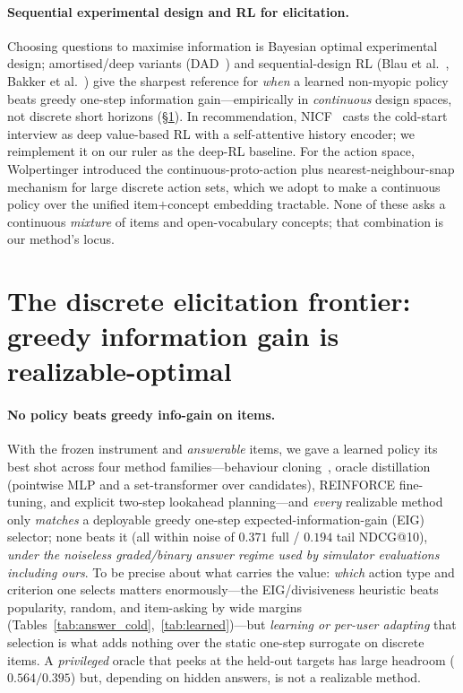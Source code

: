 \documentclass[11pt]{article}
\begin{document}
\paragraph{Sequential experimental design and RL for elicitation.} Choosing questions to maximise
information is Bayesian optimal experimental design; amortised/deep variants (DAD~\cite{dad}) and
sequential-design RL (Blau et al.~\cite{blau22}, Bakker et al.~\cite{bakker20}) give the sharpest
reference for \emph{when} a learned non-myopic policy beats greedy one-step information gain---empirically
in \emph{continuous} design spaces, not discrete short horizons (\S\ref{sec:discrete}). In recommendation,
NICF~\cite{nicf} casts the cold-start interview as deep value-based RL with a self-attentive history
encoder; we reimplement it on our ruler as the deep-RL baseline. For the action space, Wolpertinger
\cite{wolp} introduced the continuous-proto-action plus nearest-neighbour-snap mechanism for large
discrete action sets, which we adopt to make a continuous policy over the unified item$+$concept
embedding tractable. None of these asks a continuous \emph{mixture} of items and open-vocabulary concepts;
that combination is our method's locus.

\section{The discrete elicitation frontier: greedy information gain is realizable-optimal}\label{sec:discrete}
\paragraph{No policy beats greedy info-gain on items.} With the frozen instrument and \emph{answerable} items, we gave a
learned policy its best shot across four method families---behaviour cloning~\cite{ross11}, oracle distillation
(pointwise MLP and a set-transformer over candidates), REINFORCE fine-tuning, and explicit two-step lookahead
planning---and \emph{every} realizable method only \emph{matches} a deployable greedy one-step expected-information-gain
(EIG) selector; none beats it (all within noise of $0.371$ full / $0.194$ tail NDCG@10), \emph{under the noiseless
graded/binary answer regime used by simulator evaluations including ours}. To be precise about what carries the value:
\emph{which} action type and criterion one selects matters enormously---the EIG/divisiveness heuristic beats popularity,
random, and item-asking by wide margins (Tables~\ref{tab:answer_cold},~\ref{tab:learned})---but \emph{learning or per-user
adapting} that selection is what adds nothing over the static one-step surrogate on discrete items. A \emph{privileged}
oracle that peeks at the held-out targets has large headroom ($0.564/0.395$) but, depending on hidden answers, is not a
realizable method.
\end{document}
